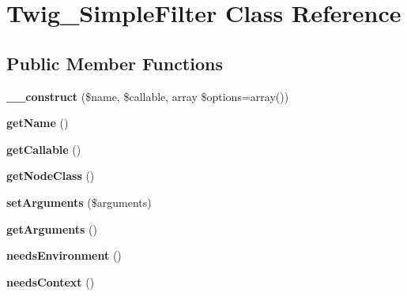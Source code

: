 \hypertarget{class_twig___simple_filter}{}\section{Twig\+\_\+\+Simple\+Filter Class Reference}
\label{class_twig___simple_filter}
\subsection*{Public Member Functions}
\begin{DoxyCompactItemize}
\item 
\hypertarget{class_twig___simple_filter_a1e24fc85f3981c10f1e71d93a4f54144}{}{\bfseries \+\_\+\+\_\+construct} (\$name, \$callable, array \$options=array())\label{class_twig___simple_filter_a1e24fc85f3981c10f1e71d93a4f54144}

\item 
\hypertarget{class_twig___simple_filter_a3d0963e68bb313b163a73f2803c64600}{}{\bfseries get\+Name} ()\label{class_twig___simple_filter_a3d0963e68bb313b163a73f2803c64600}

\item 
\hypertarget{class_twig___simple_filter_a0be839e0782a38a172c386bd963375c9}{}{\bfseries get\+Callable} ()\label{class_twig___simple_filter_a0be839e0782a38a172c386bd963375c9}

\item 
\hypertarget{class_twig___simple_filter_a8d85021f1f19e71dd99d7dfdd138c927}{}{\bfseries get\+Node\+Class} ()\label{class_twig___simple_filter_a8d85021f1f19e71dd99d7dfdd138c927}

\item 
\hypertarget{class_twig___simple_filter_a2b7df0e0f61ee886144db2d59fc0d7da}{}{\bfseries set\+Arguments} (\$arguments)\label{class_twig___simple_filter_a2b7df0e0f61ee886144db2d59fc0d7da}

\item 
\hypertarget{class_twig___simple_filter_a1d4c324c5a088be98d99d3efbf3502e1}{}{\bfseries get\+Arguments} ()\label{class_twig___simple_filter_a1d4c324c5a088be98d99d3efbf3502e1}

\item 
\hypertarget{class_twig___simple_filter_a711311882c7dd1058f92f7eb0e8edeeb}{}{\bfseries needs\+Environment} ()\label{class_twig___simple_filter_a711311882c7dd1058f92f7eb0e8edeeb}

\item 
\hypertarget{class_twig___simple_filter_a52c35bc6da8861f40aa59f1b99f7ef0f}{}{\bfseries needs\+Context} ()\label{class_twig___simple_filter_a52c35bc6da8861f40aa59f1b99f7ef0f}


\end{DoxyCompactItemize}
